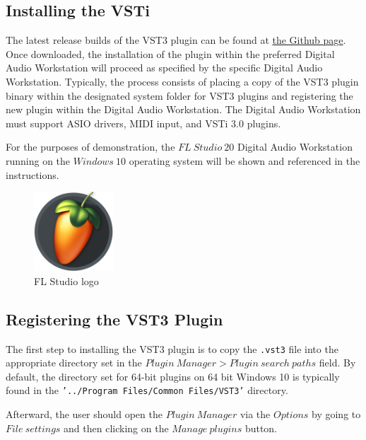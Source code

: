 \documentclass[a4paper,12pt]{report}
\begin{document}
\subsection{Installing the VSTi}
\label{subsec:installvsti}
The latest release builds of the VST3 plugin can be found at \href{https://github.com/ParadoxChains/C3JI5D-Evan-Sitt-BSc-Thesis/tree/master/Release\%20Builds}{the Github page}. Once downloaded, the installation of the plugin within the preferred Digital Audio Workstation will proceed as specified by the specific Digital Audio Workstation. Typically, the process consists of placing a copy of the VST3 plugin binary within the designated system folder for VST3 plugins and registering the new plugin within the Digital Audio Workstation. The Digital Audio Workstation must support ASIO drivers, MIDI input, and VSTi 3.0 plugins.

For the purposes of demonstration, the $FL\ Studio\ 20$ Digital Audio Workstation running on the $Windows\ 10$ operating system will be shown and referenced in the instructions.

\begin{figure} \centering
\includegraphics[width=8em]{FLStudioLogo.png}
    \caption{FL Studio logo}     \label{fig:FLLogo} \end{figure}

\subsection{Registering the VST3 Plugin}
\label{subsec:registeringvsti}
The first step to installing the VST3 plugin is to copy the \texttt{.vst3} file into the appropriate directory set in the $Plugin\ Manager > Plugin\ search\ paths$ field. By default, the directory set for 64-bit plugins on 64 bit Windows 10 is typically found in the \texttt{'../Program Files/Common Files/VST3'} directory. 

Afterward, the user should open the $Plugin\ Manager$ via the $Options$ by going to $File\ settings$ and then clicking on the $Manage\ plugins$ button. 
\end{document}
